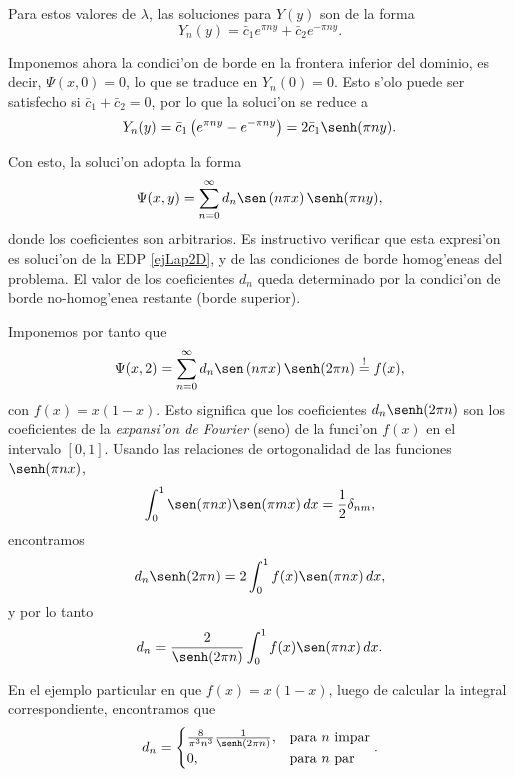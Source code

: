 Para estos valores de $\lambda$, las soluciones para $Y(y)$ son de la forma
\begin{equation}
Y_n(y) = \bar{c}_1e^{\pi ny} + \bar{c}_2e^{-\pi ny}.
\end{equation}

Imponemos ahora la condici'on de borde en la frontera inferior del dominio, es decir, $\Psi(x,0) = 0$, lo que se traduce en $Y_n(0)=0$. Esto s'olo puede ser satisfecho si $\bar{c}_1+\bar{c}_2=0$, por lo que la soluci'on se reduce a
\begin{equation}
Y_n(y) = \bar{c}_1\left(e^{\pi ny} -e^{-\pi ny}\right) = 2\bar{c}_1 \senh(\pi ny).
\end{equation}

Con esto, la soluci'on adopta la forma
\begin{equation}\label{ejLap2D2}
\Psi(x,y) = \sum_{n=0}^\infty d_n \sen\left(n\pi x\right)\senh(\pi ny),
\end{equation}
donde los coeficientes son arbitrarios. Es instructivo verificar que esta expresi'on es soluci'on de la EDP \eqref{ejLap2D}, y de las condiciones de borde homog'eneas del problema. El valor de los coeficientes $d_n$ queda determinado por la condici'on de borde no-homog'enea restante (borde superior).

Imponemos por tanto que
\begin{equation}
\Psi(x,2) = \sum_{n=0}^\infty d_n \sen\left(n\pi x\right)\senh(2\pi n) \stackrel{!}{=} f(x),
\end{equation}
con $f(x)=x(1-x)$. Esto significa que los coeficientes $d_n\senh(2\pi n)$ son los coeficientes de la \textit{expansi'on de Fourier} (seno) de la funci'on $f(x)$ en el intervalo $[0,1]$. Usando las relaciones de ortogonalidad de las funciones $\senh(\pi nx)$, 
\begin{equation}
\int_0^1 \sen(\pi nx)\sen(\pi mx)\,dx = \frac{1}{2}\delta_{nm},
\end{equation}
encontramos
\begin{equation}
d_n\senh(2\pi n) = 2 \int_0^1 f(x)\sen(\pi nx)\,dx,
\end{equation}
y por lo tanto
\begin{equation}
d_n = \frac{2}{\senh(2\pi n)} \int_0^1 f(x)\sen(\pi nx)\,dx.
\end{equation}

En el ejemplo particular en que $f(x)=x(1-x)$, luego de calcular la integral correspondiente, encontramos que
\begin{equation}
d_n = \begin{cases}
	\frac{8}{\pi^3n^3}\frac{1}{\senh(2\pi n)} , & \text{para } n \text{ impar} \\
	0 , & \text{para } n \text{ par} \end{cases}.
\end{equation}

